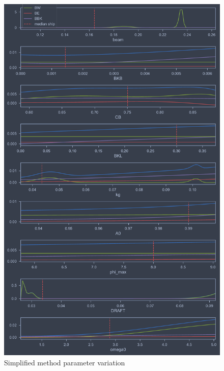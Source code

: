 \begin{figure}[H]
    \centering
    \includegraphics[width=0.9\columnwidth]{figures/ikeda_variation.pdf}
    \caption{Simplified method parameter variation}
    \label{fig:ikeda_variation}
\end{figure}
